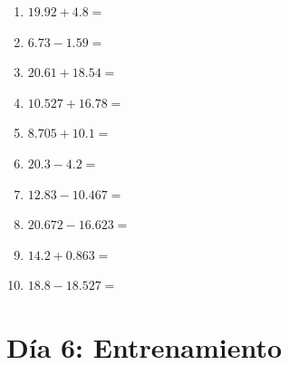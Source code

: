 \documentclass[12pt]{article}
\begin{document}
\begin{enumerate}
\newpage
\item \large $ 19.92 + 4.8 = $ \vspace{1.5cm}
\item \large $ 6.73 - 1.59 = $ \vspace{1.5cm}
\item \large $ 20.61 + 18.54 = $ \vspace{1.5cm}
\item \large $ 10.527 + 16.78 = $ \vspace{1.5cm}
\item \large $ 8.705 + 10.1 = $ \vspace{1.5cm}
\item \large $ 20.3 - 4.2 = $ \vspace{1.5cm}
\item \large $ 12.83 - 10.467 = $ \vspace{1.5cm}
\item \large $ 20.672 - 16.623 = $ \vspace{1.5cm}
\item \large $ 14.2 + 0.863 = $ \vspace{1.5cm}
\item \large $ 18.8 - 18.527 = $ \vspace{1.5cm}
\end{enumerate}\newpage
\section*{Día 6: Entrenamiento}
\end{document}
